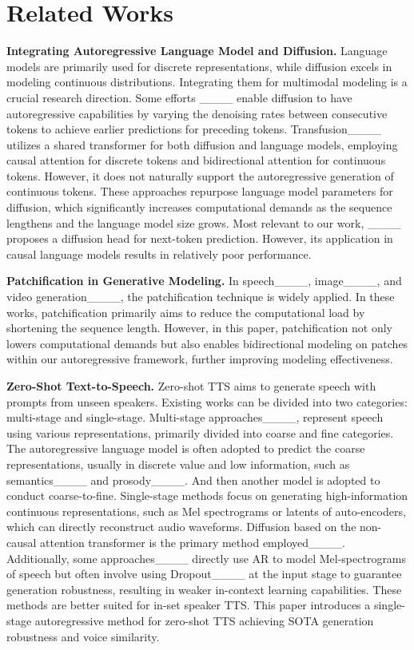 \section{Related Works}
\textbf{Integrating Autoregressive Language Model and Diffusion.} 
Language models are primarily used for discrete representations, while diffusion excels in modeling continuous distributions. Integrating them for multimodal modeling is a crucial research direction.
Some efforts ____ enable diffusion to have autoregressive capabilities by varying the denoising rates between consecutive tokens to achieve earlier predictions for preceding tokens.
Transfusion____ utilizes a shared transformer for both diffusion and language models, employing causal attention for discrete tokens and bidirectional attention for continuous tokens. However, it does not naturally support the autoregressive generation of continuous tokens.
These approaches repurpose language model parameters for diffusion, which significantly increases computational demands as the sequence lengthens and the language model size grows.
Most relevant to our work, ____ proposes a diffusion head for next-token prediction. However, its application in causal language models results in relatively poor performance.

\textbf{Patchification in Generative Modeling.}
In speech____, image____, and video generation____, the patchification technique is widely applied. In these works, patchification primarily aims to reduce the computational load by shortening the sequence length. However, in this paper, patchification not only lowers computational demands but also enables bidirectional modeling on patches within our autoregressive framework, further improving modeling effectiveness.


\textbf{Zero-Shot Text-to-Speech.} Zero-shot TTS aims to generate speech with prompts from unseen speakers.
Existing works can be divided into two categories: multi-stage and single-stage.
Multi-stage approaches____, represent speech using various representations, primarily divided into coarse and fine categories. 
The autoregressive language model is often adopted to predict the coarse representations, usually in discrete value and low information, such as semantics____ and prosody____. And then another model is adopted to conduct coarse-to-fine. 
Single-stage methods focus on generating high-information continuous representations, such as Mel spectrograms or latents of auto-encoders, which can directly reconstruct audio waveforms.
Diffusion based on the non-causal attention transformer is the primary method employed____.
Additionally, some approaches____ directly use AR to model Mel-spectrograms of speech but often involve using Dropout____ at the input stage to guarantee generation robustness, resulting in weaker in-context learning capabilities. These methods are better suited for in-set speaker TTS.
This paper introduces a single-stage autoregressive method for zero-shot TTS achieving SOTA generation robustness and voice similarity.


